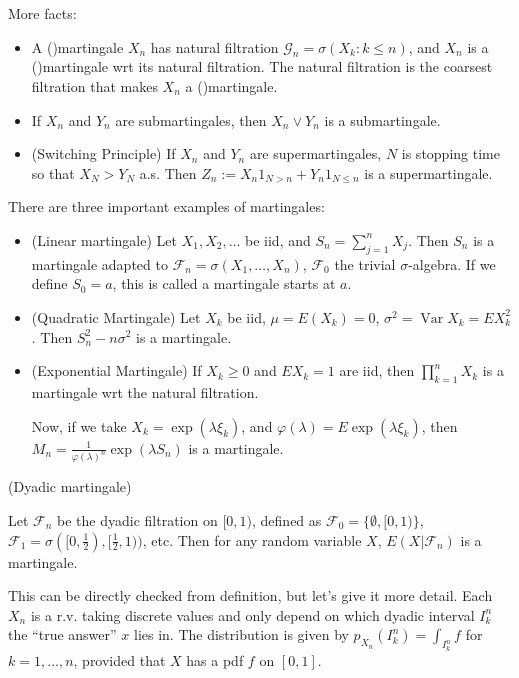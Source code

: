 More facts:
\begin{itemize}
	\item A ()martingale $X_n$ has natural filtration $\mathcal{G}_n = \sigma(X_k: k\le n)$, and $X_n$ is a ()martingale wrt its natural filtration. The natural filtration is the coarsest filtration that makes $X_n$ a ()martingale.
	\item If $X_n$ and $Y_n$ are submartingales, then $X_n \vee Y_n$ is a submartingale.
	\item (Switching Principle) If $X_n$ and $Y_n$ are supermartingales, $N$ is stopping time so that $X_N > Y_N$ a.s. Then $Z_n := X_n 1_{N > n} + Y_n 1_{N \le  n}$ is a supermartingale.
\end{itemize}


There are three important examples of martingales:
\begin{itemize}
	\item (Linear martingale)
	Let  $X_1, X_2, \ldots$ be iid, and $S_n = \sum_{j = 1}^n X_j$. Then $S_n$ is a martingale adapted to $\mathcal{F}_n = \sigma(X_1, \ldots, X_n)$,  $\mathcal{F}_0$ the trivial $\sigma$-algebra. If we define $S_0 = a$, this is called a martingale starts at $a$.
\item (Quadratic Martingale)
	Let $X_ k$ be iid, $\mu = E(X_k) = 0$, $\sigma^2 = \operatorname{Var} X_k = E X_k^2$. Then $S_n^2 - n \sigma^2$ is a martingale.
\item (Exponential Martingale)
	If $X_k \ge 0$ and $E X_k = 1$ are iid, then $\prod_{k = 1}^n X_k $ is a martingale wrt the natural filtration.

	Now, if we take $X_k = \exp(\lambda \xi_k)$, and $\varphi(\lambda) = E \exp(\lambda \xi_k)$, then $M_n = \frac{1}{\varphi(\lambda)^n} \exp(\lambda S_n)$ is a martingale.
\end{itemize}

\begin{example}
	(Dyadic martingale)

	Let $\mathcal{F}_n$ be the dyadic filtration on $[0,1)$, defined as $\mathcal{F}_0 = \{\emptyset , [0,1)\} $, $\mathcal{F}_1 = \sigma([0,\frac{1}{2}), [\frac{1}{2}, 1))$, etc. Then for any random variable $X$, $E(X | \mathcal{F}_n)$ is a martingale.

	This can be directly checked from definition, but let's give it more detail. Each $X_n$ is a r.v. taking discrete values and only depend on which dyadic interval $I^n_k$ the ``true answer'' $x$ lies in. The distribution is given by $p_{X_n}(I^n_k) = \int _{I^n_k} f$ for $k = 1, \ldots, n$, provided that $X$ has a pdf $f$ on $[0,1]$.
\end{example}

